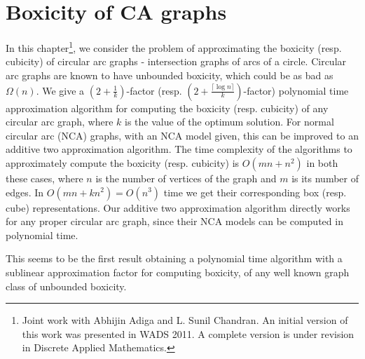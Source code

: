 \chapter{Boxicity of CA graphs}\label{ch:cabox}
  In this chapter\footnote{Joint work with Abhijin Adiga and L. Sunil Chandran. An initial version of this work was presented in WADS 2011. 
A complete version is under revision in Discrete Applied Mathematics.}, we consider the problem of approximating the boxicity (resp. cubicity) of circular arc graphs - intersection graphs of arcs of a circle. Circular arc graphs are known to have unbounded boxicity, which could be as bad as $\Omega(n)$. We give a $\left(2+\frac{1}{k}\right)$-factor (resp. $\left(2+\frac{\lceil\log{n}\rceil}{k}\right)$-factor) polynomial time approximation algorithm for computing the boxicity (resp. cubicity) of any circular arc graph, where $k$ is the value of the optimum solution. For normal circular arc (NCA) graphs, with an NCA model given, this can be improved to an additive two approximation algorithm. The time complexity of the algorithms to approximately compute the boxicity (resp. cubicity) is $O(mn+n^2)$ in both these cases, where $n$ is the number of vertices of the graph and 
$m$ is its number of edges. In $O(mn+kn^2)= O(n^3)$ time we get their corresponding box (resp. cube) representations. Our additive two approximation algorithm directly works for any 
proper circular arc graph, since their NCA models can be computed in polynomial time.

This seems to be the first result obtaining a polynomial time algorithm with a sublinear approximation factor for computing boxicity, 
of any well known graph class of unbounded boxicity. 
